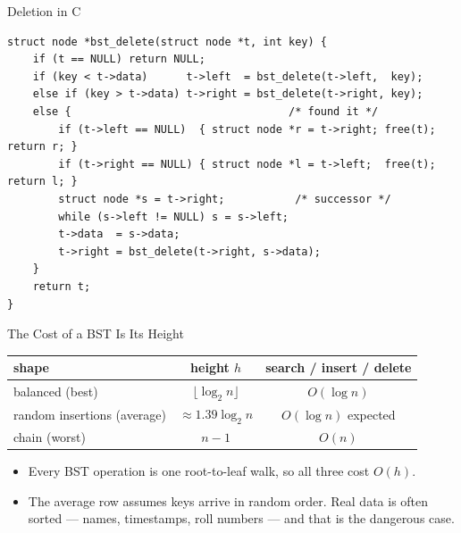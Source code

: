 \documentclass[aspectratio=169]{beamer}
\begin{document}
\begin{frame}[fragile]{Deletion in C}
  \scriptsize
\begin{verbatim}
struct node *bst_delete(struct node *t, int key) {
    if (t == NULL) return NULL;
    if (key < t->data)      t->left  = bst_delete(t->left,  key);
    else if (key > t->data) t->right = bst_delete(t->right, key);
    else {                                  /* found it */
        if (t->left == NULL)  { struct node *r = t->right; free(t); return r; }
        if (t->right == NULL) { struct node *l = t->left;  free(t); return l; }
        struct node *s = t->right;           /* successor */
        while (s->left != NULL) s = s->left;
        t->data  = s->data;
        t->right = bst_delete(t->right, s->data);
    }
    return t;
}
\end{verbatim}
  \vspace{-0.1cm}
  \footnotesize
\end{frame}

\begin{frame}{The Cost of a BST Is Its Height}
  \begin{center}
  {\footnotesize
  \begin{tabular}{l c c}
    \toprule
    \textbf{shape} & \textbf{height $h$} & \textbf{search / insert / delete} \\
    \midrule
    balanced (best) & $\lfloor \log_2 n \rfloor$ & $O(\log n)$ \\
    random insertions (average) & $\approx 1.39\log_2 n$ & $O(\log n)$ expected \\
    chain (worst) & $n-1$ & $O(n)$ \\
    \bottomrule
  \end{tabular}}
  \end{center}
  \begin{itemize}
    \item Every BST operation is one root-to-leaf walk, so all three cost
      $O(h)$.
    \item The average row assumes keys arrive in random order. Real data is
      often sorted --- names, timestamps, roll numbers --- and that is the
      dangerous case.
  \end{itemize}
\end{frame}
\end{document}
